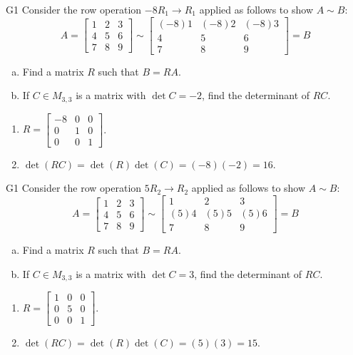 \begin{problem}{G1}
Consider the row operation \(-8R_1\to R_1\) applied as follows to show
\(A\sim B\):
\[
A=\begin{bmatrix}1&2&3\\4&5&6\\7&8&9\end{bmatrix}
  \sim
\begin{bmatrix}(-8)1&(-8)2&(-8)3\\4&5&6\\7&8&9\end{bmatrix}=B
\]
\begin{enumerate}[(a)]
\item Find a matrix \(R\) such that \(B=RA\).
\item If \(C \in M_{3,3}\) is a matrix with \(\det C = -2\), find the determinant of \(RC\).
\end{enumerate}
\end{problem}
\begin{solution}
\begin{enumerate}
\item \(R= \begin{bmatrix} -8 & 0 & 0 \\ 0 & 1 & 0 \\ 0 & 0 & 1 \end{bmatrix}\).
\item \(\det(RC)= \det(R)\det(C)=(-8)(-2)=16\).
\end{enumerate}
\end{solution}

\begin{problem}{G1}
Consider the row operation \(5R_2\to R_2\) applied as follows to show
\(A\sim B\):
\[
A=\begin{bmatrix}1&2&3\\4&5&6\\7&8&9\end{bmatrix}
  \sim
\begin{bmatrix}1&2&3\\(5)4&(5)5&(5)6\\7&8&9\end{bmatrix}=B
\]
\begin{enumerate}[(a)]
\item Find a matrix \(R\) such that \(B=RA\).
\item If \(C \in M_{3,3}\) is a matrix with \(\det C = 3\), find the determinant of \(RC\).
\end{enumerate}
\end{problem}
\begin{solution}
\begin{enumerate}
\item \(R= \begin{bmatrix} 1 & 0 & 0 \\ 0 & 5 & 0 \\ 0 & 0 & 1 \end{bmatrix}\).
\item \(\det(RC)= \det(R)\det(C)=(5)(3)=15\).
\end{enumerate}
\end{solution}

